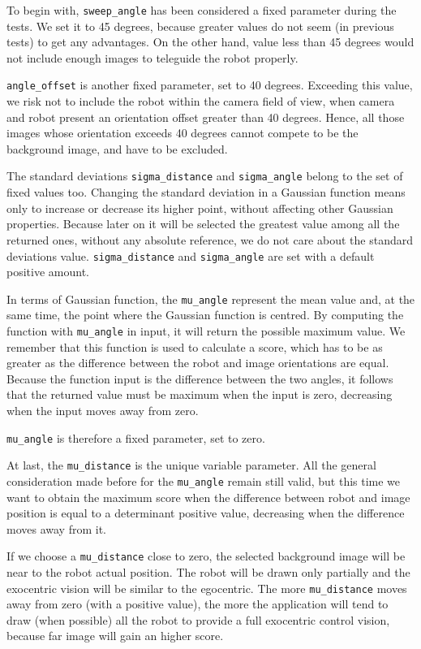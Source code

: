 %

%

%
To begin with, \texttt{sweep\_angle} has been considered a fixed parameter during the tests. We set it to 45 degrees,
because greater values do not seem (in previous tests) to get any advantages. On the other hand, value less than 45
degrees would not include enough images to teleguide the robot properly.
%

%
\texttt{angle\_offset} is another fixed parameter, set to 40 degrees. Exceeding this value, we risk not to include
the robot within the camera field of view, when camera and robot present an orientation offset greater than 40 degrees.
Hence, all those images whose orientation exceeds 40 degrees cannot compete to be the background image, 
and have to be excluded.
%

%
The standard deviations \texttt{sigma\_distance} and \texttt{sigma\_angle} belong to the set of
fixed values too. Changing the standard deviation in a Gaussian function means only to increase or decrease its higher
point, without affecting other Gaussian properties. Because later on it will be selected the greatest value among
all the returned ones, without any absolute reference, we do not care about the standard deviations value.
\texttt{sigma\_distance} and \texttt{sigma\_angle} are set with a default positive amount.
%

%
In terms of Gaussian function, the \texttt{mu\_angle} represent the mean value and, at the same time, the point where
the Gaussian function is centred. By computing the function with \texttt{mu\_angle} in input, it will return the possible
maximum value. We remember that this function is used to calculate a score, which has to be as greater as the difference
between the robot and image orientations are equal. Because the function input is the difference between the two angles, it
follows that the returned value must be maximum when the input is zero, decreasing when the input moves away from zero.
%

%
\texttt{mu\_angle} is therefore a fixed parameter, set to zero.
%

%
At last, the \texttt{mu\_distance} is the unique variable parameter. All the general consideration made before for the 
\texttt{mu\_angle} remain still valid, but this time we want to obtain the maximum score when the difference between
robot and image position is equal to a determinant positive value, decreasing when the difference moves away from it.
%

%
If we choose a \texttt{mu\_distance} close to zero, the selected background image will be near to the robot actual position.
The robot will be drawn only partially and the exocentric vision will be similar to the egocentric. The more
\texttt{mu\_distance} moves away from zero (with a positive value), the more the application will tend to draw
(when possible) all the robot to provide a full exocentric control vision, because far image will gain an higher score.
%
